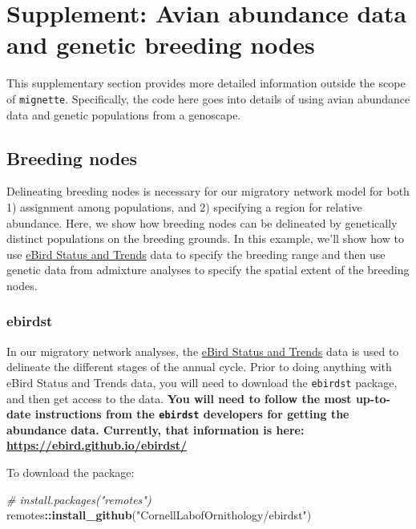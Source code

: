 \documentclass[
]{book}
\newenvironment{Shaded}{\begin{snugshade}}{\end{snugshade}}
\newcommand{\CommentTok}[1]{\textcolor[rgb]{0.56,0.35,0.01}{\textit{#1}}}
\newcommand{\FunctionTok}[1]{\textcolor[rgb]{0.13,0.29,0.53}{\textbf{#1}}}
\newcommand{\NormalTok}[1]{#1}
\newcommand{\SpecialCharTok}[1]{\textcolor[rgb]{0.81,0.36,0.00}{\textbf{#1}}}
\newcommand{\StringTok}[1]{\textcolor[rgb]{0.31,0.60,0.02}{#1}}
\begin{document}
\hypertarget{supplemental}{%
\chapter{Supplement: Avian abundance data and genetic breeding nodes}\label{supplemental}}

This supplementary section provides more detailed information outside the scope of \texttt{mignette}. Specifically, the code here goes into details of using avian abundance data and genetic populations from a genoscape.

\hypertarget{breeding-nodes}{%
\section{Breeding nodes}\label{breeding-nodes}}

Delineating breeding nodes is necessary for our migratory network model for both 1) assignment among populations, and 2) specifying a region for relative abundance. Here, we show how breeding nodes can be delineated by genetically distinct populations on the breeding grounds. In this example, we'll show how to use \href{https://ebird.org/science/status-and-trends}{eBird Status and Trends} data to specify the breeding range and then use genetic data from admixture analyses to specify the spatial extent of the breeding nodes.

\hypertarget{ebirdst}{%
\subsection{ebirdst}\label{ebirdst}}

In our migratory network analyses, the \href{https://science.ebird.org/en/status-and-trends}{eBird Status and Trends} data is used to delineate the different stages of the annual cycle. Prior to doing anything with eBird Status and Trends data, you will need to download the \texttt{ebirdst} package, and then get access to the data. \textbf{You will need to follow the most up-to-date instructions from the \texttt{ebirdst} developers for getting the abundance data. Currently, that information is here: \url{https://ebird.github.io/ebirdst/}}

To download the package:

\begin{Shaded}
\begin{Highlighting}[]
\CommentTok{\# install.packages("remotes")}
\NormalTok{remotes}\SpecialCharTok{::}\FunctionTok{install\_github}\NormalTok{(}\StringTok{"CornellLabofOrnithology/ebirdst"}\NormalTok{)}
\end{Highlighting}
\end{Shaded}
\end{document}
